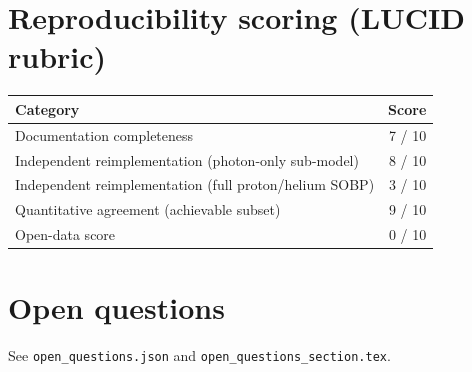 \documentclass[11pt]{article}
\begin{document}
\section{Reproducibility scoring (LUCID rubric)}

\begin{tabular}{lr}
\toprule
Category & Score \\
\midrule
Documentation completeness            & 7 / 10 \\
Independent reimplementation (photon-only sub-model)  & 8 / 10 \\
Independent reimplementation (full proton/helium SOBP) & 3 / 10 \\
Quantitative agreement (achievable subset) & 9 / 10 \\
Open-data score                       & 0 / 10 \\
\bottomrule
\end{tabular}

\section{Open questions}

See \texttt{open\_questions.json} and \texttt{open\_questions\_section.tex}.
\end{document}
